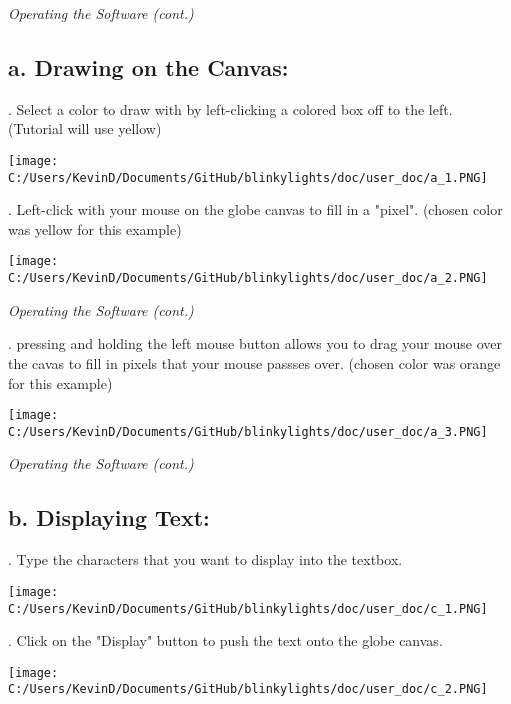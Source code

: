 \documentclass[12pt, a4paper]{ article}
\begin{document}
\newpage %
\noindent \textit{Operating the Software (cont.)}

\subsection*{a. Drawing on the Canvas:} 
\vspace{.5cm}

. Select a color to draw with by left-clicking a colored box off to the left. (Tutorial will use yellow)
\begin{center}
\texttt{[image: C:/Users/KevinD/Documents/GitHub/blinkylights/doc/user\_doc/a\_1.PNG]}
\end{center}
\vspace{1cm}


. Left-click with your mouse on the globe canvas to fill in a "pixel". (chosen color was yellow for this example)
\begin{center}
\texttt{[image: C:/Users/KevinD/Documents/GitHub/blinkylights/doc/user\_doc/a\_2.PNG]}
\end{center}
\vspace{1cm}

\newpage %
\noindent \textit{Operating the Software (cont.)}
\vspace{.5cm}


. pressing and holding the left mouse button allows you to drag your mouse over the cavas to fill in pixels that your mouse passses over. (chosen color was orange for this example)
\begin{center}
\texttt{[image: C:/Users/KevinD/Documents/GitHub/blinkylights/doc/user\_doc/a\_3.PNG]}
\end{center}
\vspace{1cm}



\newpage %
\noindent \textit{Operating the Software (cont.)}


\subsection*{b. Displaying Text:} 
\vspace{.5cm}

. Type the characters that you want to display into the textbox.
\begin{center}
\texttt{[image: C:/Users/KevinD/Documents/GitHub/blinkylights/doc/user\_doc/c\_1.PNG]}
\end{center}
\vspace{1cm}

. Click on the "Display" button to push the text onto the globe canvas.
\begin{center}
\texttt{[image: C:/Users/KevinD/Documents/GitHub/blinkylights/doc/user\_doc/c\_2.PNG]}
\end{center}
\vspace{1cm}
\end{document}
